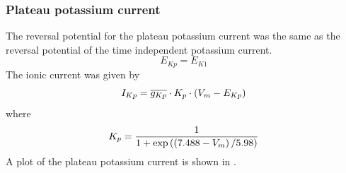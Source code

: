 \subsubsection{Plateau potassium current}
The reversal potential for the plateau potassium current was the same as the
reversal potential of the time independent potassium current.
\begin{equation}
  E_{Kp}=E_{K1}
\end{equation}
The ionic current was given by
\begin{equation}
 I_{Kp}=\overline{g_{Kp}}\cdot K_p\cdot \left( V_m-E_{Kp} \right)
\end{equation}
where
\begin{equation}
  K_p=\dfrac{1}{1+\exp\left( \left( 7.488-V_m \right)/5.98 \right)}
\end{equation}
A plot of the plateau potassium current is shown in .
